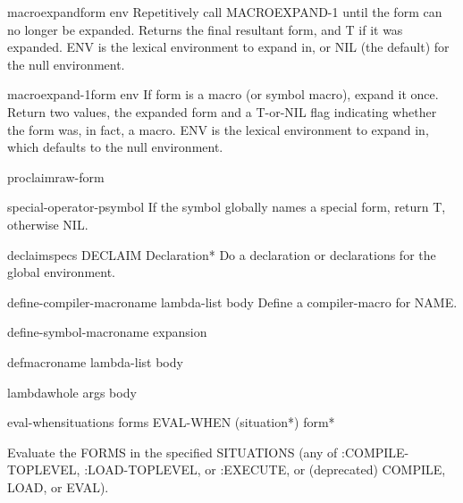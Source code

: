\begin{function}{macroexpand}{form \op env}{}{}
  Repetitively call MACROEXPAND-1 until the form can no longer be expanded.
   Returns the final resultant form, and T if it was expanded. ENV is the
   lexical environment to expand in, or NIL (the default) for the null
   environment.
\end{function}

\begin{function}{macroexpand-1}{form \op env}{}{}
  If form is a macro (or symbol macro), expand it once. Return two values,
   the expanded form and a T-or-NIL flag indicating whether the form was, in
   fact, a macro. ENV is the lexical environment to expand in, which defaults
   to the null environment.
\end{function}

\begin{function}{proclaim}{raw-form}{}{}
  
\end{function}

\begin{function}{special-operator-p}{symbol}{}{}
  If the symbol globally names a special form, return T, otherwise NIL.
\end{function}

\begin{macro}{declaim}{\rest specs}{}{}
  DECLAIM Declaration*
  Do a declaration or declarations for the global environment.
\end{macro}

\begin{macro}{define-compiler-macro}{name lambda-list \body body}{}{}
  Define a compiler-macro for NAME.
\end{macro}

\begin{macro}{define-symbol-macro}{name expansion}{}{}
  
\end{macro}

\begin{macro}{defmacro}{name lambda-list \rest body}{}{}
  
\end{macro}

\begin{macro}{lambda}{\whole whole args \body body}{}{}
  
\end{macro}

\begin{specialop}{eval-when}{situations \rest forms}{}{}
  EVAL-WHEN (situation*) form*

Evaluate the FORMS in the specified SITUATIONS (any of :COMPILE-TOPLEVEL,
:LOAD-TOPLEVEL, or :EXECUTE, or (deprecated) COMPILE, LOAD, or EVAL).
\end{specialop}

